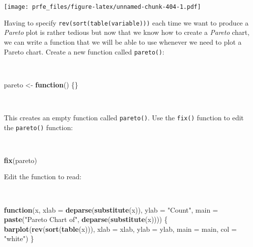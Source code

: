 \documentclass[12pt,a4paper]{book}
\newenvironment{Shaded}{\begin{snugshade}}{\end{snugshade}}
\newcommand{\ControlFlowTok}[1]{\textcolor[rgb]{0.13,0.29,0.53}{\textbf{#1}}}
\newcommand{\DataTypeTok}[1]{\textcolor[rgb]{0.13,0.29,0.53}{#1}}
\newcommand{\KeywordTok}[1]{\textcolor[rgb]{0.13,0.29,0.53}{\textbf{#1}}}
\newcommand{\NormalTok}[1]{#1}
\newcommand{\StringTok}[1]{\textcolor[rgb]{0.31,0.60,0.02}{#1}}
\theoremstyle{definition}
\theoremstyle{definition}
\theoremstyle{definition}
\theoremstyle{remark}
\begin{document}
\texttt{[image: prfe\_files/figure-latex/unnamed-chunk-404-1.pdf]}

\newpage

Having to specify \texttt{rev(sort(table(variable)))} each time we want
to produce a \emph{Pareto} plot is rather tedious but now that we know
how to create a \emph{Pareto} chart, we can write a function that we
will be able to use whenever we need to plot a Pareto chart. Create a
new function called \texttt{pareto()}:

~

\begin{Shaded}
\begin{Highlighting}[]
\NormalTok{pareto <-}\StringTok{ }\ControlFlowTok{function}\NormalTok{() \{\}}
\end{Highlighting}
\end{Shaded}

~

This creates an empty function called \texttt{pareto()}. Use the
\texttt{fix()} function to edit the \texttt{pareto()} function:

~

\begin{Shaded}
\begin{Highlighting}[]
\KeywordTok{fix}\NormalTok{(pareto)}
\end{Highlighting}
\end{Shaded}

Edit the function to read:

~

\begin{Shaded}
\begin{Highlighting}[]
\ControlFlowTok{function}\NormalTok{(x,}
         \DataTypeTok{xlab =} \KeywordTok{deparse}\NormalTok{(}\KeywordTok{substitute}\NormalTok{(x)),}
         \DataTypeTok{ylab =} \StringTok{"Count"}\NormalTok{,}
         \DataTypeTok{main =} \KeywordTok{paste}\NormalTok{(}\StringTok{"Pareto Chart of"}\NormalTok{, }\KeywordTok{deparse}\NormalTok{(}\KeywordTok{substitute}\NormalTok{(x)))) \{}
  \KeywordTok{barplot}\NormalTok{(}\KeywordTok{rev}\NormalTok{(}\KeywordTok{sort}\NormalTok{(}\KeywordTok{table}\NormalTok{(x))),}
          \DataTypeTok{xlab =}\NormalTok{ xlab,}
          \DataTypeTok{ylab =}\NormalTok{ ylab,}
          \DataTypeTok{main =}\NormalTok{ main,}
          \DataTypeTok{col =} \StringTok{"white"}\NormalTok{)}
\NormalTok{\}}
\end{Highlighting}
\end{Shaded}
\end{document}
